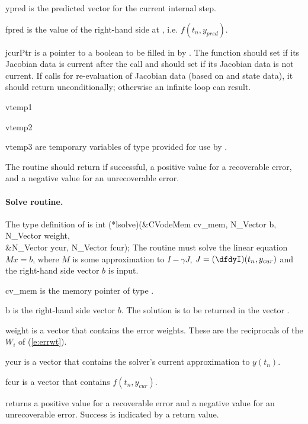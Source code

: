 {\begin{args}[convfail]
   \item[ypred]
     is the predicted  vector for the current {\cvodes} internal step.
  
   \item[fpred]
     is the value of the right-hand side at , i.e. $f(t_n, y_{pred})$.
  
   \item[jcurPtr]
     is a pointer to a boolean to be filled in by .  
     The function should set  if its Jacobian 
     data is current after the call and should set         
      if its Jacobian data is not current.   
     If  calls for re-evaluation of         
     Jacobian data (based on  and {\cvodes} state      
     data), it should return  unconditionally;
     otherwise an infinite loop can result.                
    
   \item[vtemp1] 
   \item[vtemp2]
   \item[vtemp3] 
     are temporary variables of type  provided for use by .      
  
   \end{args}
}
{
  The  routine should return  if successful,            
  a positive value for a recoverable error, and a negative value  
  for an unrecoverable error.  
}
{}


\paragraph{Solve routine.}
The type definition of  is
{
  int (*lsolve)(&CVodeMem cv\_mem, N\_Vector b, N\_Vector weight, \\
                &N\_Vector ycur, N\_Vector fcur);  
}
{
  The routine  must solve the linear equation $M x = b$, where         
  $M$ is some approximation to $I - \gamma J$, $J = (\dfdyI)(t_n, y_{cur})$  
  and the right-hand side vector $b$ is input. 
}
{
  \begin{args}[cv\_mem]
  \item[cv\_mem]
    is the {\cvodes} memory pointer of type .
  \item[b]
    is the right-hand side vector $b$. The solution is to be    
    returned in the vector .
  \item[weight]
    is a vector that contains the error weights.
    These are the reciprocals of the $W_i$ of (\ref{e:errwt}).
  \item[ycur]
    is a vector that contains the solver's current approximation to $y(t_n)$.
  \item[fcur]
    is a vector that contains $f(t_n,y_{cur})$. 
  \end{args}
}
{
   returns a positive value    
  for a recoverable error and a negative value for an             
  unrecoverable error. Success is indicated by a  return value.
}
{}

